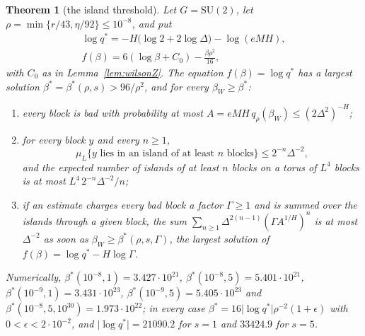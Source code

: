 \documentclass[11pt]{amsart}
\newtheorem{theorem}{Theorem}[section]
\theoremstyle{definition}
\theoremstyle{remark}
\numberwithin{equation}{section}
\newcommand{\SU}{\mathrm{SU}}
\begin{document}
\begin{theorem}[the island threshold]\label{thm:islandthreshold}
Let $G=\SU(2)$, let $\rho=\min\{r/43,\eta/92\}\le10^{-8}$, and put
\begin{gather*}
\log q^*=-H\bigl(\log2+2\log\varDelta\bigr)-\log(eMH),\\
f(\beta)=6(\log\beta+C_0)-\frac{\beta\rho^2}{16},
\end{gather*}
with $C_0$ as in Lemma~\ref{lem:wilsonZ}. The equation $f(\beta)=\log q^*$
has a largest solution $\beta^*=\beta^*(\rho,s)>96/\rho^2$, and for every
$\beta_W\ge\beta^*$:
\begin{enumerate}[label=\textup{(\roman*)},leftmargin=*]
\item every block is bad with probability at most $A=eMH\,q_\rho(\beta_W)
\le(2\varDelta^2)^{-H}$;
\item for every block $y$ and every $n\ge1$,
\[
\mu_L\{y\text{ lies in an island of at least }n\text{ blocks}\}\le
2^{-n}\varDelta^{-2},
\]
and the expected number of islands of at least $n$ blocks on a torus of
$L^4$ blocks is at most $L^4\,2^{-n}\varDelta^{-2}/n$;
\item if an estimate charges every bad block a factor $\varGamma\ge1$ and is
summed over the islands through a given block, the sum
$\sum_{n\ge1}\varDelta^{2(n-1)}(\varGamma A^{1/H})^n$ is at most
$\varDelta^{-2}$ as
soon as $\beta_W\ge\beta^*(\rho,s,\varGamma)$, the largest solution of
$f(\beta)=\log q^*-H\log\varGamma$.
\end{enumerate}
Numerically, $\beta^*(10^{-8},1)=3.427\cdot10^{21}$,
$\beta^*(10^{-8},5)=5.401\cdot10^{21}$, $\beta^*(10^{-9},1)=3.431\cdot
10^{23}$, $\beta^*(10^{-9},5)=5.405\cdot10^{23}$ and
$\beta^*(10^{-8},5,10^{30})=1.973\cdot10^{22}$; in every case
$\beta^*=16\lvert\log q^*\rvert\rho^{-2}(1+\epsilon)$ with
$0<\epsilon<2\cdot10^{-2}$, and $\lvert\log q^*\rvert=21090.2$ for $s=1$ and
$33424.9$ for $s=5$.
\end{theorem}
\end{document}
